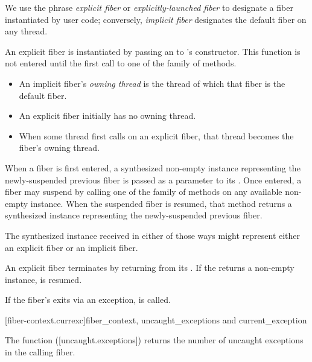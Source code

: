 We use the phrase \emph{explicit fiber} or \emph{explicitly-launched fiber} to
designate a fiber instantiated by user code; conversely, \emph{implicit fiber}
designates the default fiber on any thread.

An explicit fiber is instantiated by passing an \emph{\entryfn} to \fiber's
constructor. This function is not entered until the first call to one of
the  family of methods.

\begin{itemize}
    \item An implicit fiber's \emph{owning thread} is the thread of which that
          fiber is the default fiber.
    \item An explicit fiber initially has no owning thread.
    \item When some thread first calls \anyresume on an explicit fiber, that
          thread becomes the fiber's owning thread.
\end{itemize}

When a fiber is first entered, a synthesized non-empty \fiber instance
representing the newly-suspended previous fiber is passed as a parameter to
its \entryfn. Once entered, a fiber may suspend by calling one of the \resume
family of methods on any available non-empty \fiber instance. When the
suspended fiber is resumed, that method returns a synthesized \fiber instance
representing the newly-suspended previous fiber.

The synthesized \fiber instance received in either of those ways might
represent either an explicit fiber or an implicit fiber.

An explicit fiber terminates by returning from its \entryfn. If the \entryfn
returns a non-empty \fiber instance,  is resumed.



If the fiber's \entryfn exits via an exception,  is called.

[fiber-context.currexc]{fiber\_context, uncaught\_exceptions and current\_exception}

The function  ([uncaught.exceptions]) returns
the number of uncaught exceptions in the calling fiber.


